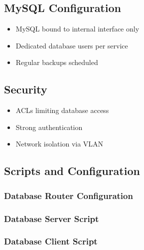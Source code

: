 \documentclass[12pt,a4paper]{article}
\begin{document}
\subsection{MySQL Configuration}

\begin{itemize}
  \item MySQL bound to internal interface only
  \item Dedicated database users per service
  \item Regular backups scheduled
\end{itemize}

\subsection{Security}

\begin{itemize}
  \item ACLs limiting database access
  \item Strong authentication
  \item Network isolation via VLAN
\end{itemize}


\subsection{Scripts and Configuration}

\subsubsection{Database Router Configuration}



\subsubsection{Database Server Script}




\subsubsection{Database Client Script}


\end{document}
